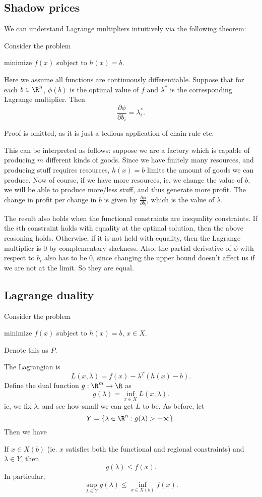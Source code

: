 \documentclass[a4paper]{article}
\begin{document}
\subsection{Shadow prices}
We can understand Lagrange multipliers intuitively via the following theorem:
\begin{thm}[]
  Consider the problem
  \begin{center}
    minimize $f(x)$ subject to $h(x) = b$.
  \end{center}
  Here we assume all functions are continuously differentiable. Suppose that for each $b\in \R^n$, $\phi(b)$ is the optimal value of $f$ and $\lambda^*$ is the corresponding Lagrange multiplier. Then
  \[
    \frac{\partial \phi}{\partial b_i} = \lambda_i^*.
  \]
\end{thm}
Proof is omitted, as it is just a tedious application of chain rule etc.

This can be interpreted as follows: suppose we are a factory which is capable of producing $m$ different kinds of goods. Since we have finitely many resources, and producing stuff requires resources, $h(x) = b$ limits the amount of goods we can produce. Now of course, if we have more resources, ie. we change the value of $b$, we will be able to produce more/less stuff, and thus generate more profit. The change in profit per change in $b$ is given by $\frac{\partial \phi}{\partial b_i}$, which is the value of $\lambda$.

The result also holds when the functional constraints are inequality constraints. If the $i$th constraint holds with equality at the optimal solution, then the above reasoning holds. Otherwise, if it is not held with equality, then the Lagrange multiplier is $0$ by complementary slackness. Also, the partial derivative of $\phi$ with respect to $b_i$ also has to be $0$, since changing the upper bound doesn't affect us if we are not at the limit. So they are equal.
\subsection{Lagrange duality}
Consider the problem
\begin{center}
  minimize $f(x)$ subject to $h(x) = b$, $x\in X$.
\end{center}
Denote this as $P$.

The Lagrangian is
\[
  L(x, \lambda) = f(x) - \lambda^T (h(x) - b).
\]
Define the dual function $g: \R^m \to \R$ as
\[
  g(\lambda) = \inf_{x\in X}L(x, \lambda).
\]
ie, we fix $\lambda$, and see how small we can get $L$ to be. As before, let
\[
  Y = \{\lambda\in \R^n: g(\lambda) > -\infty\}.
\]
Then we have
\begin{thm}
  If $x\in X(b)$ (ie. $x$ satisfies both the functional and regional constraints) and $\lambda \in Y$, then
  \[
    g(\lambda) \leq f(x).
  \]
  In particular,
  \[
    \sup_{\lambda\in Y}g(\lambda) \leq \inf_{x\in X(b)}f(x).
  \]
\end{thm}
\end{document}
